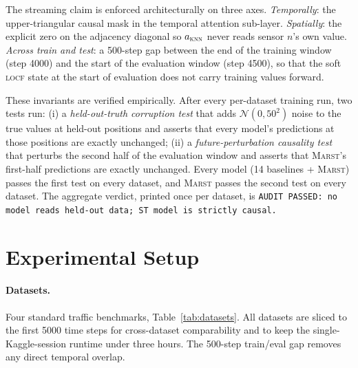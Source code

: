 \documentclass[11pt]{article}
\newcommand{\MARST}{\textsc{Marst}\xspace}
\newcommand{\LOCF}{\textsc{locf}\xspace}
\newcommand{\KNN}{\textsc{knn}\xspace}
\begin{document}
The streaming claim is enforced architecturally on three axes.
\emph{Temporally}: the upper-triangular causal mask in the temporal
attention sub-layer.  \emph{Spatially}: the explicit zero on the
adjacency diagonal so $a_{\KNN}$ never reads sensor $n$'s own value.
\emph{Across train and test}: a 500-step gap between the end of the
training window (step 4000) and the start of the evaluation window
(step 4500), so that the soft \LOCF state at the start of evaluation
does not carry training values forward.

These invariants are verified empirically.  After every per-dataset
training run, two tests run: (i) a \emph{held-out-truth corruption test}
that adds $\mathcal{N}(0, 50^2)$ noise to the true values at held-out
positions and asserts that every model's predictions at those positions
are exactly unchanged; (ii) a \emph{future-perturbation causality test}
that perturbs the second half of the evaluation window and asserts that
\MARST{}'s first-half predictions are exactly unchanged.  Every model
(14 baselines + \MARST) passes the first test on every dataset, and
\MARST passes the second test on every dataset.  The aggregate verdict,
printed once per dataset, is
\texttt{AUDIT PASSED: no model reads held-out data; ST model is
strictly causal.}

\section{Experimental Setup}
\label{sec:setup}

\paragraph{Datasets.}  Four standard traffic benchmarks,
Table~\ref{tab:datasets}.  All datasets are sliced to the first 5000
time steps for cross-dataset comparability and to keep the
single-Kaggle-session runtime under three hours.  The 500-step
train/eval gap removes any direct temporal overlap.
\end{document}
